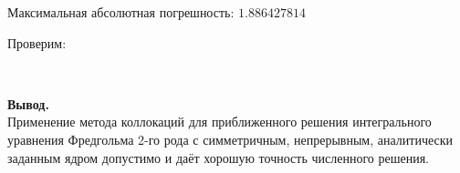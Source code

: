 \documentclass[14pt,a4paper]{scrartcl}
\begin{document}
Максимальная абсолютная погрешность: $1.886427814$

Проверим:

\begin{figure}[H]
	\begin{minipage}[h]{1\linewidth}
		  \\
	\end{minipage}
\end{figure}

\textbf{Вывод.}\\
Применение метода коллокаций для приближенного решения интегрального уравнения Фредгольма 2-го рода с симметричным, непрерывным, аналитически заданным ядром допустимо и даёт хорошую точность численного решения.
\end{document}
